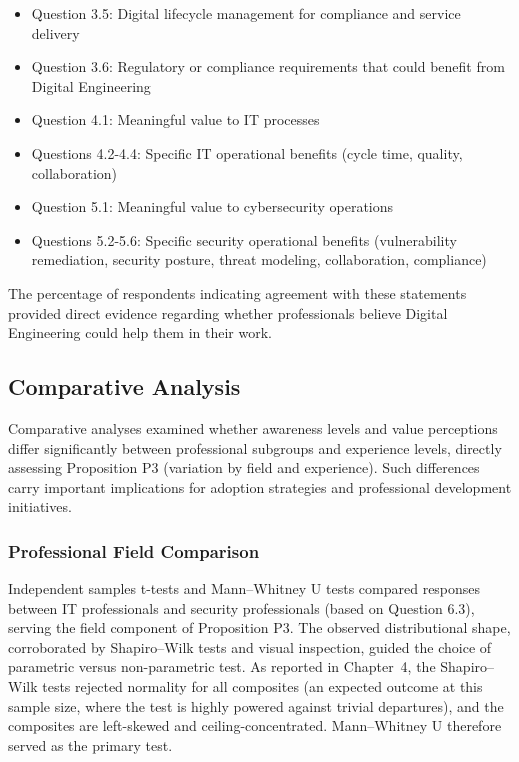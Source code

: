 \begin{itemize}
  \item Question 3.5: Digital lifecycle management for compliance and service delivery
  \item Question 3.6: Regulatory or compliance requirements that could benefit from Digital Engineering
  \item Question 4.1: Meaningful value to IT processes
  \item Questions 4.2-4.4: Specific IT operational benefits (cycle time, quality, collaboration)
  \item Question 5.1: Meaningful value to cybersecurity operations
  \item Questions 5.2-5.6: Specific security operational benefits (vulnerability remediation, security posture, threat modeling, collaboration, compliance)
\end{itemize}

The percentage of respondents indicating agreement with these statements provided direct evidence regarding whether professionals believe Digital Engineering could help them in their work.

\subsection{Comparative Analysis}

Comparative analyses examined whether awareness levels and value perceptions differ significantly between professional subgroups and experience levels, directly assessing Proposition P3 (variation by field and experience). Such differences carry important implications for adoption strategies and professional development initiatives.

\subsubsection{Professional Field Comparison}

Independent samples t-tests and Mann--Whitney U tests compared responses between IT professionals and security professionals (based on Question 6.3), serving the field component of Proposition P3. The observed distributional shape, corroborated by Shapiro--Wilk tests and visual inspection, guided the choice of parametric versus non-parametric test. As reported in Chapter~4, the Shapiro--Wilk tests rejected normality for all composites (an expected outcome at this sample size, where the test is highly powered against trivial departures), and the composites are left-skewed and ceiling-concentrated. Mann--Whitney U therefore served as the primary test.

